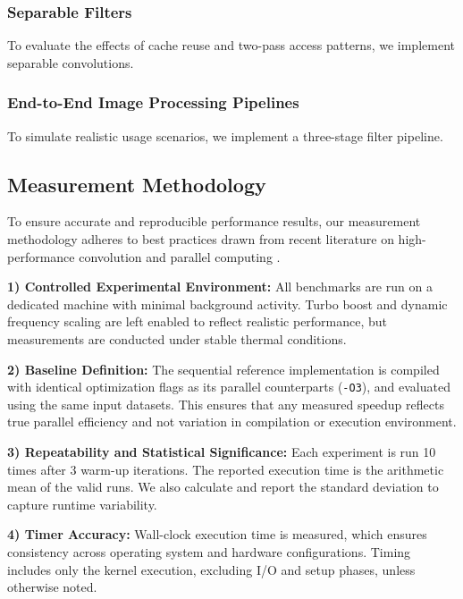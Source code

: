 \documentclass[conference, 10pt]{IEEEtran}
\begin{document}
\subsubsection{\textbf{Separable Filters}}

To evaluate the effects of cache reuse and two-pass access patterns, we implement separable convolutions.



\subsubsection{\textbf{End-to-End Image Processing Pipelines}}

To simulate realistic usage scenarios, we implement a three-stage filter pipeline.



\subsection{\textbf{Measurement Methodology}}

To ensure accurate and reproducible performance results, our measurement methodology adheres to best practices drawn from recent literature on high-performance convolution and parallel computing \cite{Gawrych2023,  Rajput2013,  Yoon2012}.

\vspace{0.5em}
\textbf{1) Controlled Experimental Environment:} All benchmarks are run on a dedicated machine with minimal background activity. Turbo boost and dynamic frequency scaling are left enabled to reflect realistic performance, but measurements are conducted under stable thermal conditions.

\vspace{0.5em}
\textbf{2) Baseline Definition:} The sequential reference implementation is compiled with identical optimization flags as its parallel counterparts (\texttt{-O3}), and evaluated using the same input datasets. This ensures that any measured speedup reflects true parallel efficiency and not variation in compilation or execution environment.

\vspace{0.5em}
\textbf{3) Repeatability and Statistical Significance:} Each experiment is run 10 times after 3 warm-up iterations. The reported execution time is the arithmetic mean of the valid runs. We also calculate and report the standard deviation to capture runtime variability.

\vspace{0.5em}
\textbf{4) Timer Accuracy:} Wall-clock execution time is measured, which ensures consistency across operating system and hardware configurations. Timing includes only the kernel execution, excluding I/O and setup phases, unless otherwise noted.
\end{document}
